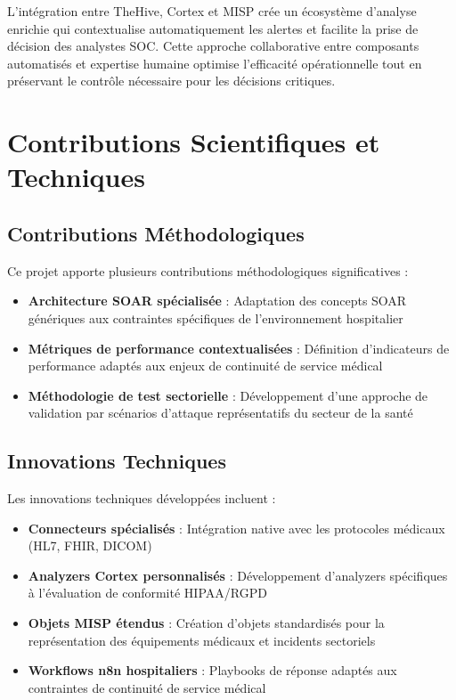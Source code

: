 L'intégration entre TheHive, Cortex et MISP crée un écosystème d'analyse enrichie qui contextualise automatiquement les alertes et facilite la prise de décision des analystes SOC. Cette approche collaborative entre composants automatisés et expertise humaine optimise l'efficacité opérationnelle tout en préservant le contrôle nécessaire pour les décisions critiques.

\section{Contributions Scientifiques et Techniques}

\subsection{Contributions Méthodologiques}

Ce projet apporte plusieurs contributions méthodologiques significatives :

\begin{itemize}
  \item \textbf{Architecture SOAR spécialisée} : Adaptation des concepts SOAR génériques aux contraintes spécifiques de l'environnement hospitalier
  \item \textbf{Métriques de performance contextualisées} : Définition d'indicateurs de performance adaptés aux enjeux de continuité de service médical
  \item \textbf{Méthodologie de test sectorielle} : Développement d'une approche de validation par scénarios d'attaque représentatifs du secteur de la santé
\end{itemize}

\subsection{Innovations Techniques}

Les innovations techniques développées incluent :

\begin{itemize}
  \item \textbf{Connecteurs spécialisés} : Intégration native avec les protocoles médicaux (HL7, FHIR, DICOM)
  \item \textbf{Analyzers Cortex personnalisés} : Développement d'analyzers spécifiques à l'évaluation de conformité HIPAA/RGPD
  \item \textbf{Objets MISP étendus} : Création d'objets standardisés pour la représentation des équipements médicaux et incidents sectoriels
  \item \textbf{Workflows n8n hospitaliers} : Playbooks de réponse adaptés aux contraintes de continuité de service médical
\end{itemize}

